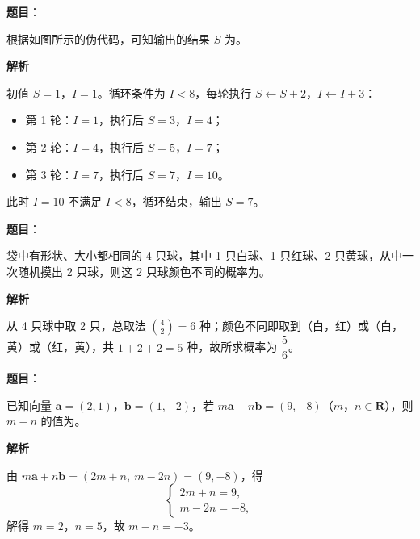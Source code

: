\begin{answer}

\textbf{题目}：

根据如图所示的伪代码，可知输出的结果 \(S\) 为\gkblank{}。
\nopagebreak[4]
\begin{center}\end{center}
\nopagebreak[4]
\textbf{解析}

初值 \(S=1\)，\(I=1\)。循环条件为 \(I<8\)，每轮执行 \(S\leftarrow S+2\)，\(I\leftarrow I+3\)：

\begin{itemize}
\item 第 1 轮：\(I=1\)，执行后 \(S=3\)，\(I=4\)；
\item 第 2 轮：\(I=4\)，执行后 \(S=5\)，\(I=7\)；
\item 第 3 轮：\(I=7\)，执行后 \(S=7\)，\(I=10\)。
\end{itemize}

此时 \(I=10\) 不满足 \(I<8\)，循环结束，输出 \(S=7\)。


\end{answer}
\begin{answer}

\textbf{题目}：

袋中有形状、大小都相同的 4 只球，其中 1 只白球、1 只红球、2 只黄球，从中一次随机摸出 2 只球，则这 2 只球颜色不同的概率为\gkblank{}。

\textbf{解析}

从 4 只球中取 2 只，总取法 \(\binom{4}{2}=6\) 种；颜色不同即取到（白，红）或（白，黄）或（红，黄），共 \(1+2+2=5\) 种，故所求概率为 \(\dfrac{5}{6}\)。


\end{answer}
\begin{answer}

\textbf{题目}：

已知向量 \(\boldsymbol a=(2,1)\)，\(\boldsymbol b=(1,-2)\)，若 \(m\boldsymbol a+n\boldsymbol b=(9,-8)\)（\(m\)，\(n\in\mathbf{R}\)），则 \(m-n\) 的值为\gkblank{}。

\textbf{解析}

由 \(m\boldsymbol a+n\boldsymbol b=(2m+n,\ m-2n)=(9,-8)\)，得
\nopagebreak[4]
\[
\begin{cases}
2m+n=9,\\
m-2n=-8,
\end{cases}
\]
解得 \(m=2\)，\(n=5\)，故 \(m-n=-3\)。


\end{answer}
